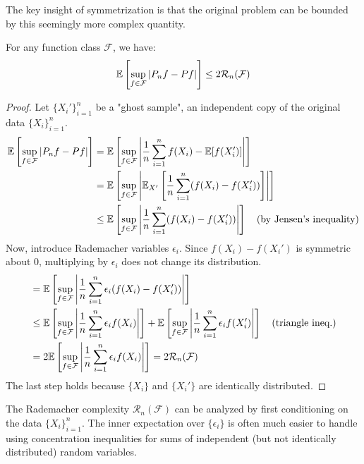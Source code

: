 The key insight of symmetrization is that the original problem can be bounded by this seemingly more complex quantity.
\begin{thm}
For any function class $\mathcal{F}$, we have:
$$ \mathbb{E}\left[\sup_{f \in \mathcal{F}} |P_n f - Pf|\right] \le 2 \mathcal{R}_n(\mathcal{F}) $$
\end{thm}
\begin{proof}
Let $\{X_i'\}_{i=1}^n$ be a "ghost sample", an independent copy of the original data $\{X_i\}_{i=1}^n$.
\begin{align*}
    \mathbb{E}\left[\sup_{f \in \mathcal{F}} |P_n f - Pf|\right] &= \mathbb{E}\left[\sup_{f \in \mathcal{F}} \left| \frac{1}{n}\sum_{i=1}^n f(X_i) - \mathbb{E}[f(X_i')] \right|\right] \\
    &= \mathbb{E}\left[\sup_{f \in \mathcal{F}} \left| \mathbb{E}_{X'}\left[\frac{1}{n}\sum_{i=1}^n (f(X_i) - f(X_i'))\right] \right|\right] \\
    &\le \mathbb{E}\left[\sup_{f \in \mathcal{F}} \left| \frac{1}{n}\sum_{i=1}^n (f(X_i) - f(X_i')) \right|\right] \quad \text{(by Jensen's inequality)}
\end{align*}
Now, introduce Rademacher variables $\epsilon_i$. Since $f(X_i) - f(X_i')$ is symmetric about 0, multiplying by $\epsilon_i$ does not change its distribution.
\begin{align*}
    &= \mathbb{E}\left[\sup_{f \in \mathcal{F}} \left| \frac{1}{n}\sum_{i=1}^n \epsilon_i(f(X_i) - f(X_i')) \right|\right] \\
    &\le \mathbb{E}\left[\sup_{f \in \mathcal{F}} \left| \frac{1}{n}\sum_{i=1}^n \epsilon_i f(X_i) \right|\right] + \mathbb{E}\left[\sup_{f \in \mathcal{F}} \left| \frac{1}{n}\sum_{i=1}^n \epsilon_i f(X_i') \right|\right] \quad \text{(triangle ineq.)} \\
    &= 2 \mathbb{E}\left[\sup_{f \in \mathcal{F}} \left| \frac{1}{n}\sum_{i=1}^n \epsilon_i f(X_i) \right|\right] = 2 \mathcal{R}_n(\mathcal{F})
\end{align*}
The last step holds because $\{X_i\}$ and $\{X_i'\}$ are identically distributed.
\end{proof}
\begin{remark}
    The Rademacher complexity $\mathcal{R}_n(\mathcal{F})$ can be analyzed by first conditioning on the data $\{X_i\}_{i=1}^n$. The inner expectation over $\{\epsilon_i\}$ is often much easier to handle using concentration inequalities for sums of independent (but not identically distributed) random variables.
\end{remark} 



